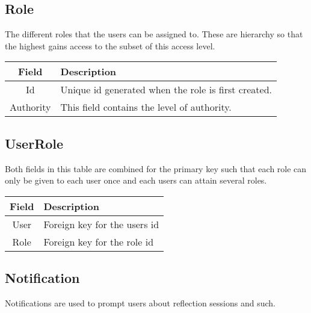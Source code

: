 \subsection*{Role}
The different roles that the users can be assigned to. These are hierarchy so that the highest gains access to the subset of this access level. \\

\vspace{0.5cm}
\begin{tabularx}{\linewidth}{| c | X |}
    \hline
    \rowcolor[gray]{0.8}
    \textbf{Field} & \textbf{Description} \\
    \hline
    Id & Unique id generated when the role is first created.\\ \hline
    Authority & This field contains the level of authority.\\
    \hline
\end{tabularx}
\vspace{0.5cm}

\subsection*{UserRole}
Both fields in this table are combined for the primary key such that each role can only be given to each user once and each users can attain several roles. \\

\vspace{0.5cm}
\begin{tabularx}{\linewidth}{| c | X |}
    \hline
    \rowcolor[gray]{0.8}
    \textbf{Field} & \textbf{Description} \\
    \hline
    User & Foreign key for the users id \\ \hline
    Role & Foreign key for the role id \\
    \hline
\end{tabularx}
\vspace{0.5cm}

\subsection*{Notification}
Notifications are used to prompt users about reflection sessions and such. \\

